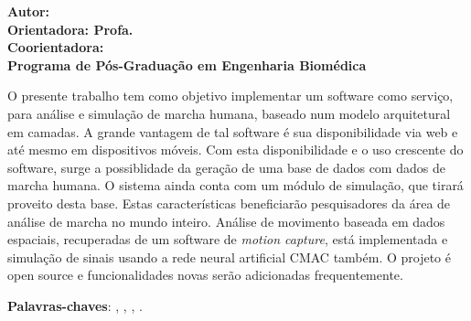 \begin{resumo}

\begin{center}
\textbf{\imprimirtitulo}
\end{center}

\begin{flushleft}
\footnotesize
\textbf{Autor: \imprimirautor }\\
\textbf{Orientadora: Profa. \imprimirorientador }\\
\textbf{Coorientadora: \imprimirmembroCoorientador} \\
\textbf{Programa de Pós-Graduação em Engenharia Biomédica} \\
\textbf{\imprimirlocal \imprimirdata }
\end{flushleft}

O presente trabalho tem como objetivo implementar um software como serviço, para análise e simulação de marcha humana, baseado num modelo arquitetural em camadas. 
A grande vantagem de tal software é sua disponibilidade via web e até mesmo em dispositivos móveis. 
Com esta disponibilidade e o uso crescente do software, surge a possiblidade da geração de uma base de dados com dados de marcha humana. 
O sistema ainda conta com um módulo de simulação, que tirará proveito desta base. 
Estas características beneficiarão pesquisadores da área de análise de marcha no mundo inteiro. 
Análise de movimento baseada em dados espaciais, recuperadas de um software de \emph{motion capture}, está implementada e simulação de sinais usando a rede neural artificial CMAC também.
O projeto é open source e funcionalidades novas serão adicionadas frequentemente.  

\vspace{\onelineskip}
    
 \noindent
 \textbf{Palavras-chaves}: \imprimirpalavrachaveum, \imprimirpalavrachavedois, 
			    \imprimirpalavrachavetres, \imprimirpalavrachavequatro.
\end{resumo}

